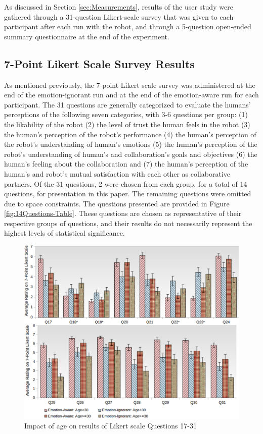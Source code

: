 \documentclass[12pt]{report}
\begin{document}
As discussed in Section \ref{sec:Measurements}, results of the user study were
gathered through a 31-question Likert-scale survey that was given to each
participant after each run with the robot, and through a 5-question open-ended
summary questionnaire at the end of the experiment.

\subsection{7-Point Likert Scale Survey Results}
As mentioned previously, the 7-point Likert scale survey was administered at
the end of the emotion-ignorant run and at the end of the emotion-aware run for
each participant. The 31 questions are generally categorized to evaluate the
humans' perceptions of the following seven categories, with 3-6 questions per
group: (1) the likability of the robot (2) the level of trust the human feels
in the robot (3) the human's perception of the robot's performance (4) the
human's perception of the robot's understanding of human's emotions (5) the
human's perception of the robot's understanding of human's and collaboration's
goals and objectives (6) the human's feeling about the collaboration and (7)
the human's perception of the human's and robot's mutual satisfaction with each
other as collaborative partners. Of the 31 questions, 2 were chosen from each
group, for a total of 14 questions, for presentation in this paper. The
remaining questions were omitted due to space constraints. The questions
presented are provided in Figure \ref{fig:14Questions-Table}. These questions
are chosen as representative of their respective groups of questions, and their
results do not necessarily represent the highest levels of statistical
significance.

\begin{figure}[tbh]
\centering
\includegraphics[width=1\textwidth]{figure/AgeComparison3_4.pdf}
\caption{Impact of age on results of Likert scale Questions 17-31}
\end{figure}
\end{document}
